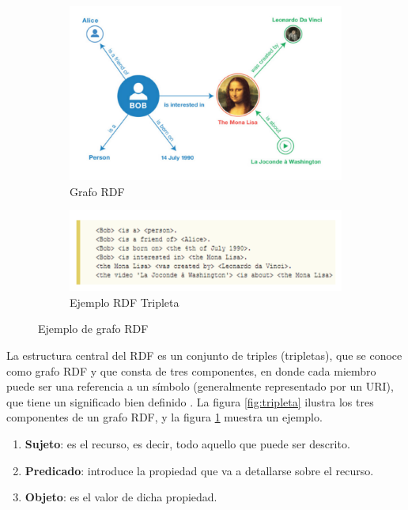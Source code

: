 \begin{figure}[H]
	\centering
	\begin{subfigure}[h]{0.71\textwidth} 
		\includegraphics[width=\textwidth]{imagenes/capitulo3/grafoRDF}
		\caption{Grafo RDF}
	\end{subfigure}       
	\begin{subfigure}[h]{0.75\textwidth} 
		\includegraphics[width=\textwidth]{imagenes/capitulo3/ejemploRDF}
		\caption{Ejemplo RDF Tripleta}
	\end{subfigure}
	\caption{Ejemplo de grafo RDF \cite{aplicacion}}
	\label{fig:ejemploRDF}
\end{figure}

La estructura central del RDF es un conjunto de triples (tripletas), que se conoce como grafo RDF y que consta de tres componentes, en donde cada miembro puede ser una referencia a un símbolo (generalmente representado por un URI), que tiene un significado bien definido \cite{web-semantica-w3c}. La figura \ref{fig:tripleta} ilustra los tres componentes de un grafo RDF, y la figura \ref{fig:ejemploRDF} muestra un ejemplo.

\begin{enumerate}
	\item \textbf{Sujeto}: es el recurso, es decir, todo aquello que puede ser descrito.
	\item \textbf{Predicado}: introduce la propiedad que va a detallarse sobre el recurso.
	\item \textbf{Objeto}: es el valor de dicha propiedad.
\end{enumerate}


